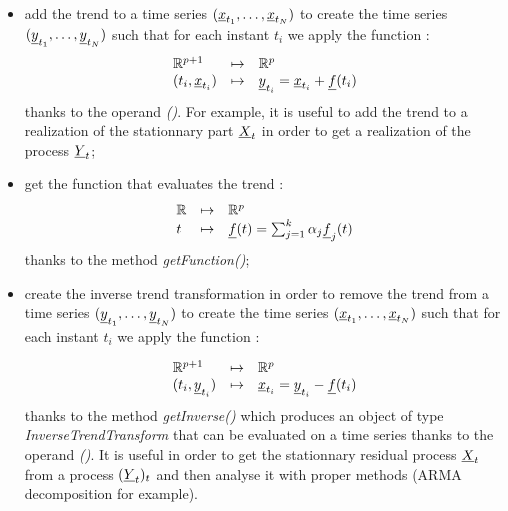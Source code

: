 \begin{itemize}
  \item  add the trend to a time series $({\underline{x}}_{t_1}, \dots,{\underline{x}}_{t_N})$ to create the time series $({\underline{y}}_{t_1}, \dots,{\underline{y}}_{t_N})$ such that for each instant $t_i$ we apply the function :
\begin{equation}
\begin{array}{lcl}\label{Eval}
  \mathbb{R}^{p+1} & \mapsto & \mathbb{R}^{p} \\
  (t_i,{\underline{x}}_{t_i}) & \mapsto & {\underline{y}}_{t_i} = {\underline{x}}_{t_i} + {\underline{f}}(t_i)
\end{array}
\end{equation}
thanks to the operand  \emph{()}. For example, it is useful to add the trend to a realization of the stationnary part ${\underline{X}}_t$ in order to get a realization of the process ${\underline{Y}}_t$;
  \item get the function that evaluates the trend :
\begin{equation}
\begin{array}{lcl}\label{Function}
  \mathbb{R} & \mapsto & \mathbb{R}^{p} \\
  t & \mapsto & {\underline{f}}(t) = \sum_{j=1}^{k} \alpha_j {\underline{f}}_j(t)
\end{array}
\end{equation}
thanks to the method \emph{getFunction()};
  \item create the inverse trend transformation in order to remove the trend from a time series $({\underline{y}}_{t_1}, \dots,{\underline{y}}_{t_N})$ to create the time series $({\underline{x}}_{t_1}, \dots,{\underline{x}}_{t_N})$ such that for each instant $t_i$ we apply the function :

\begin{equation}
\begin{array}{lcl}\label{Inverse}
  \mathbb{R}^{p+1} & \mapsto & \mathbb{R}^{p} \\
  (t_i,{\underline{y}}_{t_i}) & \mapsto & {\underline{x}}_{t_i} = {\underline{y}}_{t_i} - {\underline{f}}(t_i)
\end{array}
\end{equation}
thanks to the method \emph{getInverse()} which produces an object of type \emph{InverseTrendTransform} that can be evaluated on a time series thanks to the operand  \emph{()}. It is useful in order to get the stationnary residual process ${\underline{X}}_t$ from a process $({\underline{Y}}_t)_t$ and then analyse it with proper methods (ARMA decomposition for example).
\end{itemize}


